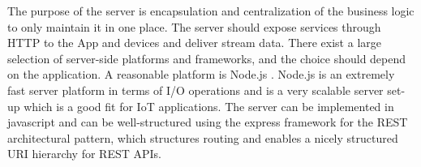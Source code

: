 The purpose of the server is encapsulation and centralization of the business logic to only maintain it in one place. The server should expose services through HTTP to the App and devices and deliver stream data. There exist a large selection of server-side platforms and frameworks, and the choice should depend on the application. A reasonable platform is Node.js \cite{node}. Node.js is an extremely fast server platform in terms of I/O operations and is a very scalable server set-up which is a good fit for IoT applications. The server can be implemented in javascript and can be well-structured using the express framework \cite{express} for the REST architectural pattern, which structures routing and enables a nicely structured URI hierarchy for REST APIs.